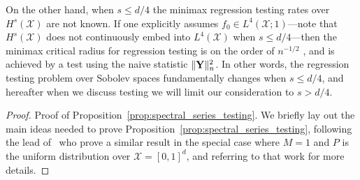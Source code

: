 \documentclass[aos]{imsart}
\theoremstyle{plain}
\theoremstyle{definition}
\theoremstyle{remark}
\newcommand{\mc}[1]{\mathcal{#1}}
\newcommand{\1}{\mathbf{1}}
\begin{document}
On the other hand, when $s \leq d/4$ the minimax regression testing rates over $H^s(\mc{X})$ are not known. If one explicitly assumes $f_0 \in L^4(\mc{X};1)$---note that $H^s(\mc{X})$ does not continuously embed into $L^4(\mc{X})$ when $s \leq d/4$---then the minimax critical radius for regression testing is on the order of $n^{-1/2}$ \citep{guerre02}, and is achieved by a test using the naive statistic $\|{\bf Y}\|_n^2$. In other words, the regression testing problem over Sobolev spaces fundamentally changes when $s \leq d/4$, and hereafter when we discuss testing we will limit our consideration to $s > d/4$. 
\begin{proof}{Proof of Proposition~\ref{prop:spectral_series_testing}.}
We briefly lay out the main ideas needed to prove Proposition~\ref{prop:spectral_series_testing}, following the lead of~\cite{ingster2009} who prove a similar result in the special case where $M = 1$ and $P$ is the uniform distribution over $\mc{X} = [0,1]^d$, and referring to that work for more details.


\end{proof}
\end{document}

